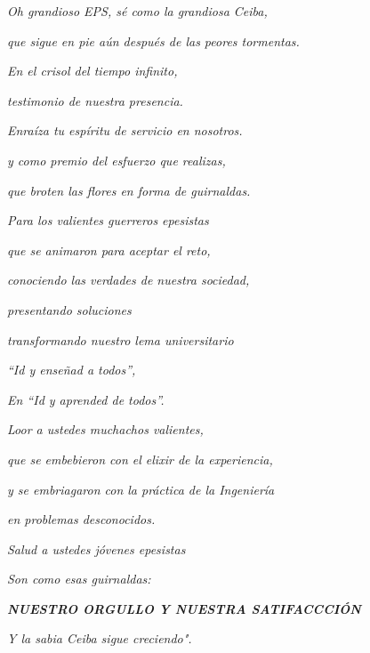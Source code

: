 \documentclass[12pt,spanish,Letterpaper,openany]{book}
\begin{document}
\begin{center}
\bigskip
\bigskip

\emph{Oh grandioso EPS, sé como la grandiosa Ceiba,}

\emph{que sigue en pie aún después de las peores tormentas.}

\emph{En el crisol del tiempo infinito,}

\emph{testimonio de nuestra presencia.}

\emph{Enraíza tu espíritu de servicio en nosotros.}

\emph{y como premio del esfuerzo que realizas,}

\emph{que broten las flores en forma de guirnaldas.}

\bigskip
\bigskip

\emph{Para los valientes guerreros epesistas}

\emph{que se animaron para aceptar el reto,}

\emph{conociendo las verdades de nuestra sociedad,}

\emph{presentando soluciones}

\emph{transformando nuestro lema universitario}

\emph{``Id y enseñad a todos'',}

\emph{En ``Id y aprended de todos''.}

\bigskip
\bigskip
\bigskip
\bigskip
\bigskip
\bigskip
\bigskip
\bigskip
\bigskip

\emph{Loor a ustedes muchachos valientes,}

\emph{que se embebieron con el elixir de la experiencia,}

\emph{y se embriagaron con la práctica de la Ingeniería}

\emph{en problemas desconocidos.}

\emph{Salud a ustedes jóvenes epesistas}

\emph{Son como esas guirnaldas:}

\textbf{\emph{NUESTRO ORGULLO Y NUESTRA SATIFACCCIÓN}}

\bigskip
\bigskip

\emph{Y la sabia Ceiba sigue creciendo".}
\end{center}
\end{document}
